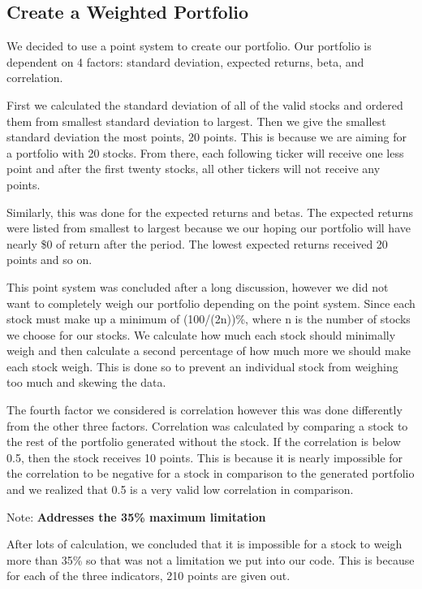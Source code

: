 \documentclass[11pt]{article}
\begin{document}
    \hypertarget{create-a-weighted-portfolio}{%
\subsection{Create a Weighted
Portfolio}\label{create-a-weighted-portfolio}}

We decided to use a point system to create our portfolio. Our portfolio
is dependent on 4 factors: standard deviation, expected returns, beta,
and correlation.

First we calculated the standard deviation of all of the valid stocks
and ordered them from smallest standard deviation to largest. Then we
give the smallest standard deviation the most points, 20 points. This is
because we are aiming for a portfolio with 20 stocks. From there, each
following ticker will receive one less point and after the first twenty
stocks, all other tickers will not receive any points.

Similarly, this was done for the expected returns and betas. The
expected returns were listed from smallest to largest because we our
hoping our portfolio will have nearly \$0 of return after the period.
The lowest expected returns received 20 points and so on.

This point system was concluded after a long discussion, however we did
not want to completely weigh our portfolio depending on the point
system. Since each stock must make up a minimum of (100/(2n))\%, where n
is the number of stocks we choose for our stocks. We calculate how much
each stock should minimally weigh and then calculate a second percentage
of how much more we should make each stock weigh. This is done so to
prevent an individual stock from weighing too much and skewing the data.

The fourth factor we considered is correlation however this was done
differently from the other three factors. Correlation was calculated by
comparing a stock to the rest of the portfolio generated without the
stock. If the correlation is below 0.5, then the stock receives 10
points. This is because it is nearly impossible for the correlation to
be negative for a stock in comparison to the generated portfolio and we
realized that 0.5 is a very valid low correlation in comparison.

Note: \textbf{Addresses the 35\% maximum limitation}

After lots of calculation, we concluded that it is impossible for a
stock to weigh more than 35\% so that was not a limitation we put into
our code. This is because for each of the three indicators, 210 points
are given out.
\end{document}
